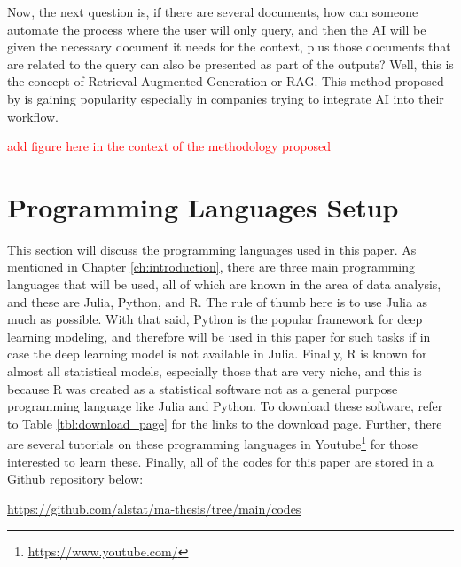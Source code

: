 Now, the next question is, if there are several documents, how can someone automate the process where the user will only query, and then the AI will be given the necessary document it needs for the context, plus those documents that are related to the query can also be presented as part of the outputs? Well, this is the concept of Retrieval-Augmented Generation or RAG. This method proposed by  is gaining popularity especially in companies trying to integrate AI into their workflow.
\begin{center}
    \textcolor{red}{add figure here in the context of the methodology proposed}
\end{center}
\section{Programming Languages Setup}\label{sec:code_setup}
This section will discuss the programming languages used in this paper. As mentioned in Chapter \ref{ch:introduction}, there are three main programming languages that will be used, all of which are known in the area of data analysis, and these are Julia, Python, and R. The rule of thumb here is to use Julia as much as possible. With that said, Python is the popular framework for deep learning modeling, and therefore will be used in this paper for such tasks if in case the deep learning model is not available in Julia. Finally, R is known for almost all statistical models, especially those that are very niche, and this is because R was created as a statistical software not as a general purpose programming language like Julia and Python. To download these software, refer to Table \ref{tbl:download_page} for the links to the download page. Further, there are several tutorials on these programming languages in Youtube\footnote{\url{https://www.youtube.com/}} for those interested to learn these. Finally, all of the codes for this paper are stored in a Github repository below:

\begin{center}
    \url{https://github.com/alstat/ma-thesis/tree/main/codes}
\end{center}

